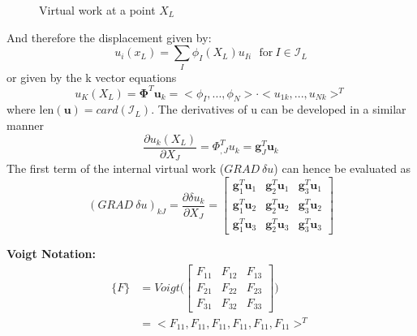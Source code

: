 \begin{figure}
	\centering
	\caption{Virtual work at a point $X_L$}
\end{figure}
\noindent And therefore the displacement given by:
\begin{equation}
u_i(x_L) = \sum_I \phi_I(X_L) u_{Ii} ~~~ \text{for}~I \in \mathcal{I}_L 
\end{equation}
or given by the k vector equations
\begin{equation}
{u_K(X_L)} = \mathbf{\Phi}^T\mathbf{u}_k =  <\phi_I,...,\phi_N>\cdot <u_{1k},...,u_{Nk}>^T
\end{equation}
where $\text{len}(\mathbf{u}) =  card(\mathcal{I}_L)$. The derivatives of u can be developed in a similar manner
\begin{equation}
\frac{\partial u_k(X_L) }{\partial X_J} = \Phi_{,J}^T u_k = \mathbf{g}^T_J \mathbf{u}_k
\end{equation}
The first term of the internal virtual work ($GRAD ~\delta u$) can hence be evaluated as 
\begin{equation}
(GRAD~ \delta u)_{kJ} = \frac{\partial \delta u_k}{\partial  X_J} = \begin{bmatrix}
\mathbf{g}_1^T \mathbf{u}_1       & \mathbf{g}_2^T \mathbf{u}_1 & \mathbf{g}_3^T \mathbf{u}_1   \\
\mathbf{g}_1^T \mathbf{u}_2       & \mathbf{g}_2^T \mathbf{u}_2 & \mathbf{g}_3^T \mathbf{u}_2     \\
\mathbf{g}_1^T \mathbf{u}_3       & \mathbf{g}_2^T \mathbf{u}_3 & \mathbf{g}_3^T \mathbf{u}_3
\end{bmatrix}
\end{equation}

\begin{tcolorbox}
\textbf{Voigt Notation:}
\begin{align}
\{F\} &= Voigt\bigg(\begin{bmatrix}
F_{11} &F_{12} &F_{13} \\
F_{21} &F_{22} &F_{23} \\
F_{31} &F_{32} &F_{33} 
\end{bmatrix}\bigg) \\
&= <F_{11},F_{11},F_{11},F_{11},F_{11},F_{11}>^T
\end{align}
\end{tcolorbox}



